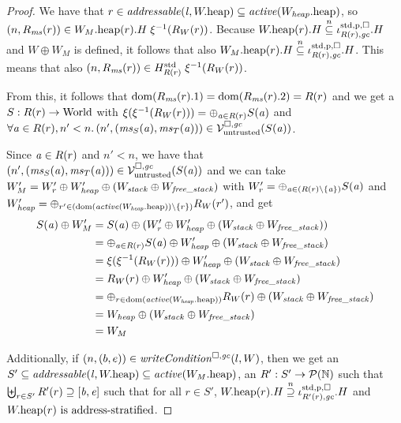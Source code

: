 \begin{proof}
  We have that $r \in \addressable{\lin, \pwheap} \subseteq
  \activeReg{\pwheap[W_\var{heap}]}$, so $\npair{R_\ms(r)} \in
  \pwheap[W_M](r).H \; \xi^{-1}(R_W(r))$.
  Because $\pwheap(r).H \nsubeq \stdreg{R(r),\gc}{\pur}.H$ and $W\oplus W_M$ is defined, it follows that
  also $\pwheap[W_M](r).H \nsubeq \stdreg{R(r),\gc}{\pur}.H$. This
  means that also $\npair{R_\ms(r)} \in
  H^{\mathrm{std}}_{R(r)}\; \xi^{-1}(R_W(r))$.

  From this, it follows that $\dom(R_\ms(r).1) = \dom(R_\ms(r).2) = R(r)$ and we get a $S : R(r) \fun \World$ with $\xi(\xi^{-1}(R_W(r))) = \oplus_{\aaddr \in R(r)} S(\aaddr)$ and $\forall \aaddr \in R(r),n' < n \ldotp \npair[n']{(\ms_S(\aaddr),\ms_T(\aaddr))} \in \lrv(S(\aaddr))$.

  Since $\aaddr \in R(r)$ and $n' < n$, we have that $\npair[n']{(\ms_S(\aaddr),\ms_T(\aaddr))} \in \lrv(S(\aaddr))$ and
  we can take $W_M' = W_r' \oplus W_{\var{heap}}' \oplus (W_{\var{stack}} \oplus W_{\var{free\_stack}})$ with $W_r' = \oplus_{\aaddr \in (R(r)\setminus \{\aaddr\})} S(\aaddr)$ and $W_\var{heap}' = \oplus_{r' \in (\dom(\activeReg{\pwheap[W_\var{heap}]})\setminus \{r\})} R_W(r')$, and get
  \begin{align*}
    S(\aaddr) \oplus W_M'
    &=S(\aaddr) \oplus (W_r' \oplus W_\var{heap}'\oplus (W_{\var{stack}} \oplus W_{\var{free\_stack}}))\\
    &=
    \oplus_{\aaddr \in R(r)} S(\aaddr) \oplus W_{\var{heap}}'\oplus (W_{\var{stack}} \oplus W_{\var{free\_stack}})\\
    &=
    \xi(\xi^{-1}(R_W(r))) \oplus W_\var{heap}'\oplus (W_{\var{stack}} \oplus W_{\var{free\_stack}})\\
    &=
    R_W(r) \oplus W_\var{heap}'\oplus (W_{\var{stack}} \oplus W_{\var{free\_stack}})\\
    &=
    \oplus_{r \in \dom(\activeReg{\pwheap[W_\var{heap}]})} R_W(r)\oplus (W_{\var{stack}} \oplus W_{\var{free\_stack}})\\
    &=
      W_\var{heap} \oplus (W_{\var{stack}} \oplus W_{\var{free\_stack}})\\
      &= W_M
  \end{align*}

  Additionally, if $\npair{(b,e)}\in\writeCond{l,W}$, then
  we get an $S'\subseteq \addressable{\lin, \pwheap} \subseteq \activeReg{\pwheap[W_M]}$, an $R' : S' \fun \powerset{\nats}$ such that $\biguplus_{r \in S'} R'(r) \supseteq [\baddr,\eaddr]$ such that
  for all $r \in S'$, $\pwheap(r).H \nsupeq \stdreg{R'(r),\gc}{\pur}.H$ and
  $\pwheap(r) \text{ is address-stratified}$.


\end{proof}
